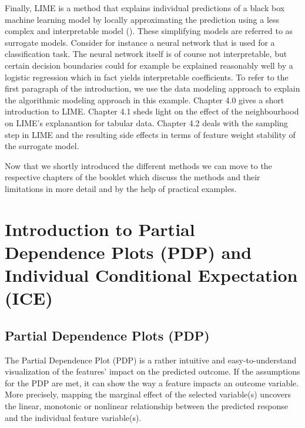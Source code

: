 \documentclass[
]{krantz}
\begin{document}
Finally, LIME is a method that explains individual predictions of a black box machine learning model by locally approximating the prediction using a less complex and interpretable model (\citet{molnar2019}). These simplifying models are referred to as surrogate models. Consider for instance a neural network that is used for a classification task. The neural network itself is of course not interpretable, but certain decision boundaries could for example be explained reasonably well by a logistic regression which in fact yields interpretable coefficients. To refer to the first paragraph of the introduction, we use the data modeling approach to explain the algorithmic modeling approach in this example. Chapter 4.0 gives a short introduction to LIME. Chapter 4.1 sheds light on the effect of the neighbourhood on LIME's explanantion for tabular data. Chapter 4.2 deals with the sampling step in LIME and the resulting side effects in terms of feature weight stability of the surrogate model.

Now that we shortly introduced the different methods we can move to the respective chapters of the booklet which discuss the methods and their limitations in more detail and by the help of practical examples.

\hypertarget{introduction-to-partial-dependence-plots-pdp-and-individual-conditional-expectation-ice}{%
\chapter{Introduction to Partial Dependence Plots (PDP) and Individual Conditional Expectation (ICE)}\label{introduction-to-partial-dependence-plots-pdp-and-individual-conditional-expectation-ice}}

\hypertarget{partial-dependence-plots-pdp}{%
\section{Partial Dependence Plots (PDP)}\label{partial-dependence-plots-pdp}}

The Partial Dependence Plot (PDP) is a rather intuitive and easy-to-understand visualization of the features' impact on the predicted outcome. If the assumptions for the PDP are met, it can show the way a feature impacts an outcome variable. More precisely, mapping the marginal effect of the selected variable(s) uncovers the linear, monotonic or nonlinear relationship between the predicted response and the individual feature variable(s).\citep{molnar2019}
\end{document}
